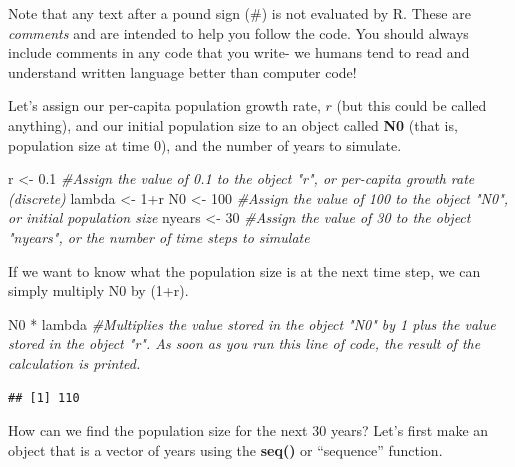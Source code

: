 \documentclass[
]{article}
\newenvironment{Shaded}{\begin{snugshade}}{\end{snugshade}}
\newcommand{\CommentTok}[1]{\textcolor[rgb]{0.56,0.35,0.01}{\textit{#1}}}
\newcommand{\DecValTok}[1]{\textcolor[rgb]{0.00,0.00,0.81}{#1}}
\newcommand{\FloatTok}[1]{\textcolor[rgb]{0.00,0.00,0.81}{#1}}
\newcommand{\NormalTok}[1]{#1}
\newcommand{\OtherTok}[1]{\textcolor[rgb]{0.56,0.35,0.01}{#1}}
\newcommand{\SpecialCharTok}[1]{\textcolor[rgb]{0.00,0.00,0.00}{#1}}
\begin{document}
Note that any text after a pound sign (\#) is not evaluated by R. These
are \emph{comments} and are intended to help you follow the code. You
should always include comments in any code that you write- we humans
tend to read and understand written language better than computer code!

Let's assign our per-capita population growth rate, \(r\) (but this
could be called anything), and our initial population size to an object
called \textbf{N0} (that is, population size at time 0), and the number
of years to simulate.

\begin{Shaded}
\begin{Highlighting}[]
\NormalTok{r }\OtherTok{\textless{}{-}} \FloatTok{0.1}     \CommentTok{\#Assign the value of 0.1 to the object "r", or per{-}capita growth rate (discrete)}
\NormalTok{lambda }\OtherTok{\textless{}{-}} \DecValTok{1}\SpecialCharTok{+}\NormalTok{r}
\NormalTok{N0 }\OtherTok{\textless{}{-}} \DecValTok{100}    \CommentTok{\#Assign the value of 100 to the object "N0", or initial population size}
\NormalTok{nyears }\OtherTok{\textless{}{-}} \DecValTok{30} \CommentTok{\#Assign the value of 30 to the object "nyears", or the number of time steps to simulate}
\end{Highlighting}
\end{Shaded}

If we want to know what the population size is at the next time step, we
can simply multiply N0 by (1+r).

\begin{Shaded}
\begin{Highlighting}[]
\NormalTok{N0 }\SpecialCharTok{*}\NormalTok{ lambda   }\CommentTok{\#Multiplies the value stored in the object "N0" by 1 plus the value stored in the object "r". As soon as you run this line of code, the result of the calculation is printed.}
\end{Highlighting}
\end{Shaded}

\begin{verbatim}
## [1] 110
\end{verbatim}

How can we find the population size for the next 30 years? Let's first
make an object that is a vector of years using the \textbf{seq()} or
``sequence'' function.
\end{document}
